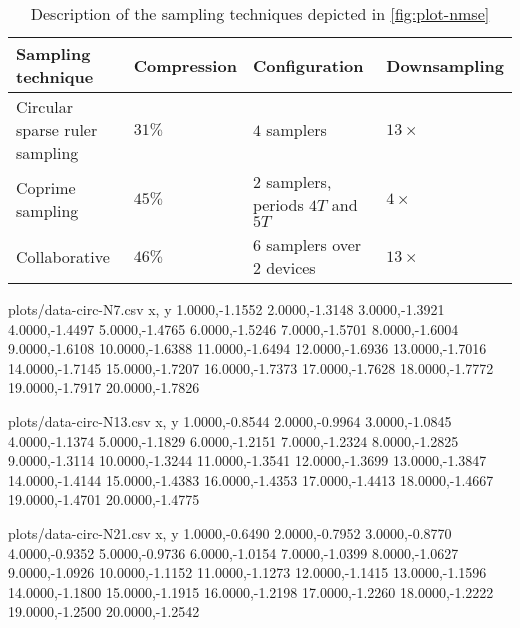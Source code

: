 \documentclass[a4paper, openany, oneside]{memoir}
\begin{document}
\begin{table}
	\centering
	\begin{tabular}{llll}
		\textbf{Sampling technique} & \textbf{Compression} & \textbf{Configuration} & \textbf{Downsampling} \\ \hline
		Circular sparse ruler sampling & $31\%$ & $4$ samplers & $13 \times$ \\
		Coprime sampling & $45\%$ & $2$ samplers, periods $4T$ and $5T$ & $4 \times$ \\
		Collaborative & $46\%$ &$6$ samplers over $2$ devices & $13 \times$
	\end{tabular}
	\caption{Description of the sampling techniques depicted in \cref{fig:plot-nmse}}
	\label{tab:sampling-nmse}
\end{table}



\begin{filecontents*}{plots/data-circ-N7.csv}
x, y
1.0000,-1.1552
2.0000,-1.3148
3.0000,-1.3921
4.0000,-1.4497
5.0000,-1.4765
6.0000,-1.5246
7.0000,-1.5701
8.0000,-1.6004
9.0000,-1.6108
10.0000,-1.6388
11.0000,-1.6494
12.0000,-1.6936
13.0000,-1.7016
14.0000,-1.7145
15.0000,-1.7207
16.0000,-1.7373
17.0000,-1.7628
18.0000,-1.7772
19.0000,-1.7917
20.0000,-1.7826
\end{filecontents*}

\begin{filecontents*}{plots/data-circ-N13.csv}
x, y
1.0000,-0.8544
2.0000,-0.9964
3.0000,-1.0845
4.0000,-1.1374
5.0000,-1.1829
6.0000,-1.2151
7.0000,-1.2324
8.0000,-1.2825
9.0000,-1.3114
10.0000,-1.3244
11.0000,-1.3541
12.0000,-1.3699
13.0000,-1.3847
14.0000,-1.4144
15.0000,-1.4383
16.0000,-1.4353
17.0000,-1.4413
18.0000,-1.4667
19.0000,-1.4701
20.0000,-1.4775
\end{filecontents*}

\begin{filecontents*}{plots/data-circ-N21.csv}
x, y
1.0000,-0.6490
2.0000,-0.7952
3.0000,-0.8770
4.0000,-0.9352
5.0000,-0.9736
6.0000,-1.0154
7.0000,-1.0399
8.0000,-1.0627
9.0000,-1.0926
10.0000,-1.1152
11.0000,-1.1273
12.0000,-1.1415
13.0000,-1.1596
14.0000,-1.1800
15.0000,-1.1915
16.0000,-1.2198
17.0000,-1.2260
18.0000,-1.2222
19.0000,-1.2500
20.0000,-1.2542
\end{filecontents*}
\end{document}
